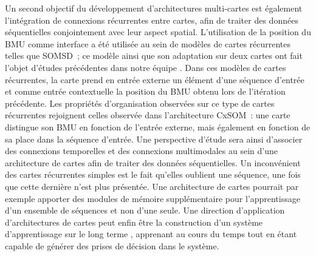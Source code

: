 Un second objectif du développement d'architectures multi-cartes est également l'intégration de connexions récurrentes entre cartes, afin de traiter des données séquentielles conjointement avec leur aspect spatial. 
L'utilisation de la position du BMU comme interface a été utilisée au sein de modèles de cartes récurrentes telles que SOMSD~; ce modèle ainsi que son adaptation sur deux cartes ont fait l'objet d'études précédentes dans notre équipe \parencite{baheux_towards_2014, fix20}. 
Dans ces modèles de cartes récurrentes, la carte prend en entrée externe un élément d'une séquence d'entrée et comme entrée contextuelle la position du BMU obtenu lors de l'itération précédente.
Les propriétés d'organisation observées sur ce type de cartes récurrentes rejoignent celles observée dans l'architecture CxSOM~: une carte distingue son BMU en fonction de l'entrée externe, mais également en fonction de sa place dans la séquence d'entrée.
Une perspective d'étude sera ainsi d'associer des connexions temporelles et des connexions multimodales au sein d'une architecture de cartes afin de traiter des données séquentielles.
Un inconvénient des cartes récurrentes simples est le fait qu'elles oublient une séquence, une fois que cette dernière n'est plus présentée. 
Une architecture de cartes pourrait par exemple apporter des modules de mémoire supplémentaire pour l'apprentissage d'un ensemble de séquences et non d'une seule.
Une direction d'application d'architectures de cartes peut enfin être la construction d'un système d'apprentissage \og sur le long terme \fg{}, apprenant au cours du temps tout en étant capable de générer des prises de décision dans le système.






